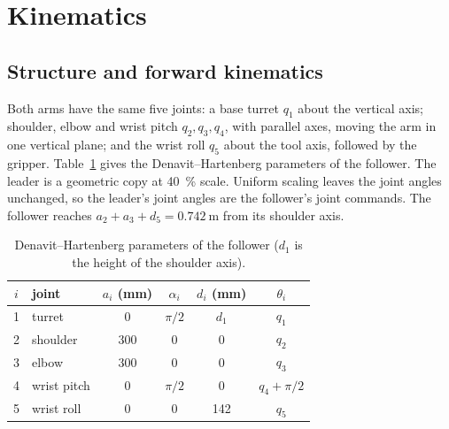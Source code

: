 \documentclass[11pt,a4paper]{article}
\begin{document}
\section{Kinematics}

\subsection{Structure and forward kinematics}

Both arms have the same five joints: a base turret $q_1$ about the vertical axis; shoulder, elbow and wrist
pitch $q_2,q_3,q_4$, with parallel axes, moving the arm in one vertical plane; and the wrist roll $q_5$ about
the tool axis, followed by the gripper. Table~\ref{tab:dh} gives the Denavit--Hartenberg parameters of the
follower. The leader is a geometric copy at \SI{40}{\percent} scale. Uniform scaling leaves the joint angles
unchanged, so the leader's joint angles are the follower's joint commands. The follower reaches
$a_2+a_3+d_5=\SI{0.742}{\metre}$ from its shoulder axis.

\begin{table}[ht]
\centering\small
\begin{tabular}{@{}clcccc@{}}
\toprule
$i$ & joint & $a_i$ (mm) & $\alpha_i$ & $d_i$ (mm) & $\theta_i$ \\
\midrule
1 & turret      & 0   & $\pi/2$ & $d_1$ & $q_1$ \\
2 & shoulder    & 300 & 0       & 0     & $q_2$ \\
3 & elbow       & 300 & 0       & 0     & $q_3$ \\
4 & wrist pitch & 0   & $\pi/2$ & 0     & $q_4+\pi/2$ \\
5 & wrist roll  & 0   & 0       & 142   & $q_5$ \\
\bottomrule
\end{tabular}
\caption{Denavit--Hartenberg parameters of the follower ($d_1$ is the height of the shoulder axis).}
\label{tab:dh}
\end{table}
\end{document}
